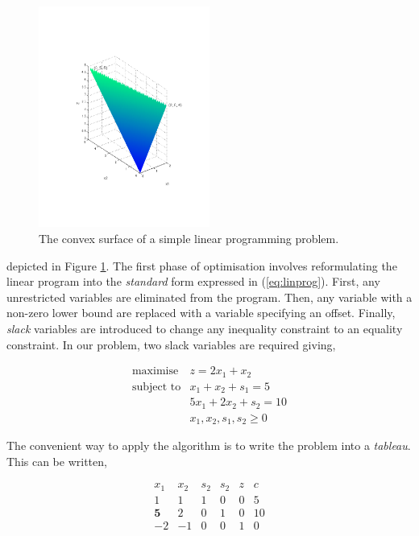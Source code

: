 \documentclass[11pt]{amsart}
\begin{document}
\begin{figure}[!ht]
\centering
\includegraphics[width=0.5\textwidth]{Figures/simplex.pdf}
\caption{The convex surface of a simple linear programming problem.}
\label{fig:simplex}
\end{figure}


depicted in Figure \ref{fig:simplex}. The first phase of optimisation involves reformulating the linear program into the \emph{standard} form expressed in (\ref{eq:linprog}). First, any unrestricted variables are eliminated from the program. Then, any variable with a non-zero lower bound are replaced with a variable specifying an offset. Finally, \emph{slack} variables are introduced to change any inequality constraint to an equality constraint. In our problem, two slack variables are required giving,

$$
\begin{array}{rl}
\text{maximise} & z = 2x_1 + x_2 \\
\text{subject to} & x_1 + x_2 + s_1 = 5 \\
& 5x_1 + 2x_2 + s_2 = 10 \\
& x_1, x_2, s_1, s_2 \geq 0
\end{array}
$$

The convenient way to apply the algorithm is to write the problem into a \emph{tableau}. This can be written,

$$
\begin{array}{rrrrr|r}
x_1&x_2&s_2&s_2&z&c \\
\hline
1&1&1&0&0&5 \\
\mathbf{5}&2&0&1&0&10 \\
\hline
-2&-1&0&0&1&0 \\
\end{array}
$$
\end{document}
